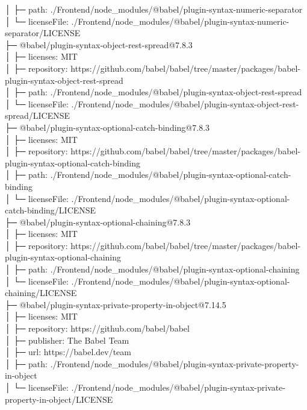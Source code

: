 │  ├─ path: ./Frontend/node\_modules/@babel/plugin-syntax-numeric-separator\\
│  └─ licenseFile: ./Frontend/node\_modules/@babel/plugin-syntax-numeric-separator/LICENSE\\
├─ @babel/plugin-syntax-object-rest-spread@7.8.3\\
│  ├─ licenses: MIT\\
│  ├─ repository: https://github.com/babel/babel/tree/master/packages/babel-plugin-syntax-object-rest-spread\\
│  ├─ path: ./Frontend/node\_modules/@babel/plugin-syntax-object-rest-spread\\
│  └─ licenseFile: ./Frontend/node\_modules/@babel/plugin-syntax-object-rest-spread/LICENSE\\
├─ @babel/plugin-syntax-optional-catch-binding@7.8.3\\
│  ├─ licenses: MIT\\
│  ├─ repository: https://github.com/babel/babel/tree/master/packages/babel-plugin-syntax-optional-catch-binding\\
│  ├─ path: ./Frontend/node\_modules/@babel/plugin-syntax-optional-catch-binding\\
│  └─ licenseFile: ./Frontend/node\_modules/@babel/plugin-syntax-optional-catch-binding/LICENSE\\
├─ @babel/plugin-syntax-optional-chaining@7.8.3\\
│  ├─ licenses: MIT\\
│  ├─ repository: https://github.com/babel/babel/tree/master/packages/babel-plugin-syntax-optional-chaining\\
│  ├─ path: ./Frontend/node\_modules/@babel/plugin-syntax-optional-chaining\\
│  └─ licenseFile: ./Frontend/node\_modules/@babel/plugin-syntax-optional-chaining/LICENSE\\
├─ @babel/plugin-syntax-private-property-in-object@7.14.5\\
│  ├─ licenses: MIT\\
│  ├─ repository: https://github.com/babel/babel\\
│  ├─ publisher: The Babel Team\\
│  ├─ url: https://babel.dev/team\\
│  ├─ path: ./Frontend/node\_modules/@babel/plugin-syntax-private-property-in-object\\
│  └─ licenseFile: ./Frontend/node\_modules/@babel/plugin-syntax-private-property-in-object/LICENSE\\
